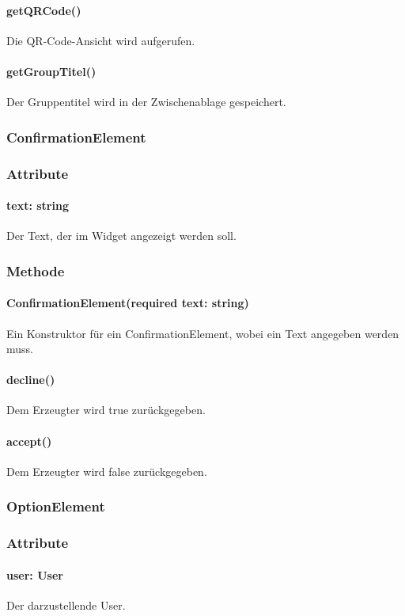 \documentclass{entwurfsheft}
\begin{document}
\paragraph*{getQRCode()} Die QR-Code-Ansicht wird aufgerufen.
\paragraph*{getGroupTitel()} Der Gruppentitel wird in der Zwischenablage gespeichert.

\subsubsection{ConfirmationElement} \label{sec:ConfirmationElement}
\subsubsection*{Attribute}
\paragraph*{text: string} Der Text, der im Widget angezeigt werden soll.

\subsubsection*{Methode}
\paragraph*{ConfirmationElement(required text: string)} Ein Konstruktor für ein ConfirmationElement, wobei ein Text angegeben werden muss.
\paragraph*{decline()} Dem Erzeugter wird true zurückgegeben.
\paragraph*{accept()} Dem Erzeugter wird false zurückgegeben.


\subsubsection{OptionElement}\label{sec:OptionElement}
\subsubsection*{Attribute}
\paragraph*{user: User} Der darzustellende User.
\end{document}
